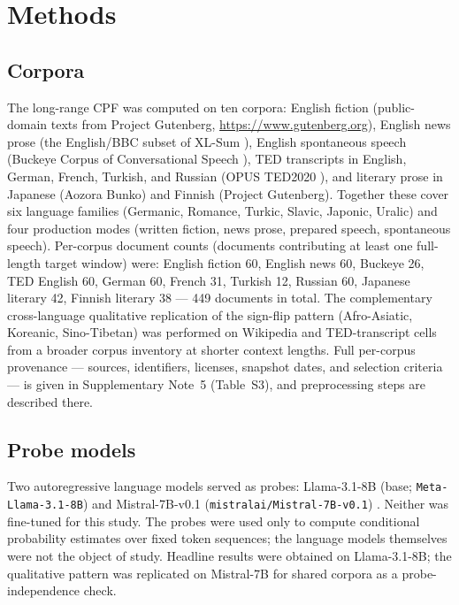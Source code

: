 \documentclass[11pt]{article}
\begin{document}
\section{Methods}

\subsection{Corpora}

The long-range CPF was computed on ten corpora: English fiction (public-domain texts
from Project Gutenberg, \url{https://www.gutenberg.org}), English news prose (the English/BBC
subset of XL-Sum \citep{hasan2021xlsum}), English spontaneous speech (Buckeye Corpus of Conversational
Speech \citep{pitt2007buckeye}), TED transcripts in English, German, French, Turkish, and Russian
(OPUS TED2020 \citep{reimers2020making, tiedemann2012parallel}), and literary prose in Japanese
(Aozora Bunko) and Finnish (Project Gutenberg). Together these cover six language families (Germanic, Romance, Turkic,
Slavic, Japonic, Uralic) and four production modes (written fiction, news prose, prepared
speech, spontaneous speech). Per-corpus document counts (documents contributing at least one
full-length target window) were: English fiction 60, English news 60, Buckeye 26, TED English 60,
German 60, French 31, Turkish 12, Russian 60, Japanese literary 42, Finnish literary 38 --- 449
documents in total. The complementary cross-language qualitative replication of the sign-flip
pattern (Afro-Asiatic, Koreanic, Sino-Tibetan) was performed on Wikipedia and TED-transcript cells
from a broader corpus inventory at shorter context lengths. Full per-corpus provenance --- sources,
identifiers, licenses, snapshot dates, and selection criteria --- is given in Supplementary Note~5 (Table~S3), and preprocessing steps are described there.

\subsection{Probe models}

Two autoregressive language models served as probes: Llama-3.1-8B (base;
\texttt{Meta-Llama-3.1-8B}) \citep{llama3herd2024} and Mistral-7B-v0.1
(\texttt{mistralai/Mistral-7B-v0.1}) \citep{jiang2023mistral}. Neither was fine-tuned for this study. The
probes were used only to compute conditional probability estimates over fixed token sequences;
the language models themselves were not the object of study. Headline results were obtained on
Llama-3.1-8B; the qualitative pattern was replicated on Mistral-7B for shared corpora as a
probe-independence check.
\end{document}

